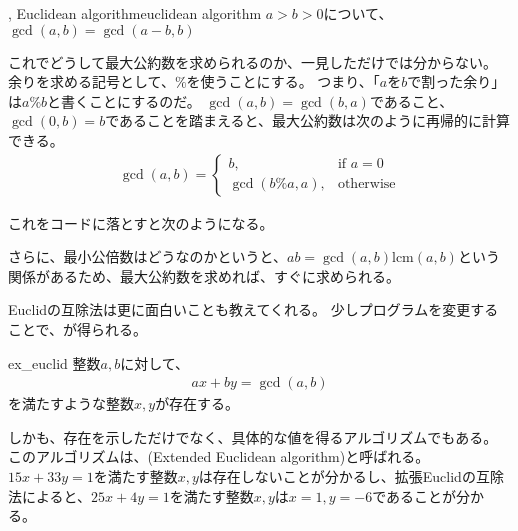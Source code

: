 \begin{Theo}{, Euclidean algorithm}{euclidean algorithm}
$a>b>0$について、$\gcd(a,b) = \gcd(a - b, b)$
\end{Theo}

これでどうして最大公約数を求められるのか、一見しただけでは分からない。
余りを求める記号として、$\%$を使うことにする。
つまり、「$a$を$b$で割った余り」は$a \% b$と書くことにするのだ。
$\gcd(a,b)=\gcd(b,a)$であること、$\gcd(0,b)=b$であることを踏まえると、最大公約数は次のように再帰的に計算できる。
\begin{align*}
\gcd(a,b) =
\begin{cases}
b, &\mbox{if } a = 0\\
\gcd(b \% a, a), &\mbox{otherwise}
\end{cases}
\end{align*}

これをコードに落とすと次のようになる。


さらに、最小公倍数はどうなのかというと、$ab = \gcd(a,b)\mbox{lcm}(a,b)$という関係があるため、最大公約数を求めれば、すぐに求められる。


Euclidの互除法は更に面白いことも教えてくれる。
少しプログラムを変更することで、が得られる。

\begin{Theo}{}{ex_euclid}
整数$a,b$に対して、
\begin{align*}
ax + by = \gcd(a,b)
\end{align*}
を満たすような整数$x,y$が存在する。
\end{Theo}

しかも、存在を示しただけでなく、具体的な値を得るアルゴリズムでもある。
このアルゴリズムは、(Extended Euclidean algorithm)と呼ばれる。
$15x+33y=1$を満たす整数$x,y$は存在しないことが分かるし、拡張Euclidの互除法によると、$25x+4y=1$を満たす整数$x,y$は$x=1,y=-6$であることが分かる。

